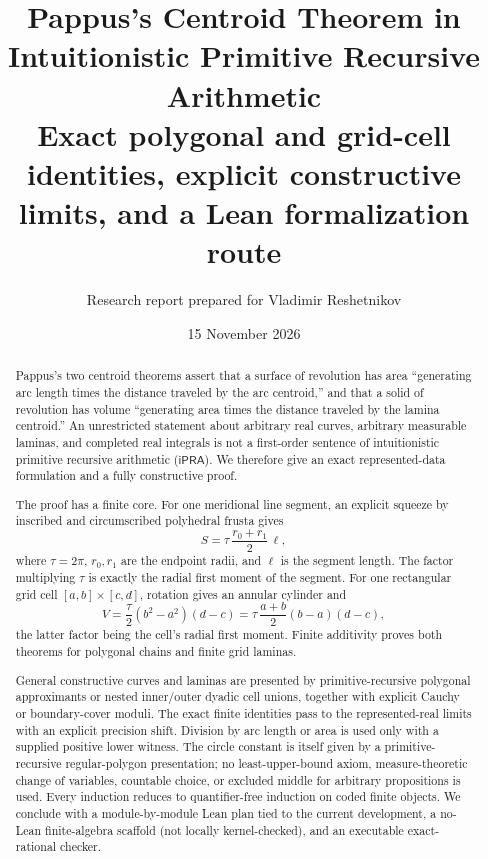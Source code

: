 \documentclass[11pt]{article}
\title{\textbf{Pappus's Centroid Theorem in Intuitionistic Primitive Recursive Arithmetic}\\
       \large Exact polygonal and grid-cell identities, explicit constructive limits, and a Lean formalization route}
\author{Research report prepared for Vladimir Reshetnikov}
\date{15 November 2026}
\theoremstyle{definition}
\newcommand{\ipra}{\mathsf{iPRA}}
\newcommand{\code}[1]{\texttt{\detokenize{#1}}}
\begin{document}
\maketitle

\begin{abstract}
Pappus's two centroid theorems assert that a surface of revolution has area
``generating arc length times the distance traveled by the arc centroid,'' and
that a solid of revolution has volume ``generating area times the distance
traveled by the lamina centroid.''  An unrestricted statement about arbitrary
real curves, arbitrary measurable laminas, and completed real integrals is not
a first-order sentence of intuitionistic primitive recursive arithmetic
(\(\ipra\)).  We therefore give an exact represented-data formulation and a
fully constructive proof.

The proof has a finite core.  For one meridional line segment, an explicit squeeze by inscribed and
circumscribed polyhedral frusta gives
\[
  S=\tau\,\frac{r_0+r_1}{2}\,\ell,
\]
where \(\tau=2\pi\), \(r_0,r_1\) are the endpoint radii, and \(\ell\) is the
segment length.  The factor multiplying \(\tau\) is exactly the radial first
moment of the segment.  For one rectangular grid cell
\([a,b]\times[c,d]\), rotation gives an annular cylinder and
\[
  V=\frac{\tau}{2}(b^2-a^2)(d-c)
   =\tau\,\frac{a+b}{2}(b-a)(d-c),
\]
the latter factor being the cell's radial first moment.  Finite additivity
proves both theorems for polygonal chains and finite grid laminas.

General constructive curves and laminas are presented by primitive-recursive
polygonal approximants or nested inner/outer dyadic cell unions, together with
explicit Cauchy or boundary-cover moduli.  The exact finite identities pass to
the represented-real limits with an explicit precision shift.  Division by
arc length or area is used only with a supplied positive lower witness.  The
circle constant is itself given by a primitive-recursive regular-polygon
presentation; no least-upper-bound axiom, measure-theoretic change of
variables, countable choice, or excluded middle for arbitrary propositions is
used.  Every induction reduces to quantifier-free induction on coded finite
objects.  We conclude with a module-by-module Lean plan tied to the current
\code{ConciseIPRA} development, a no-\code{sorry} Lean finite-algebra scaffold (not locally kernel-checked), and
an executable exact-rational checker.
\end{abstract}

\tableofcontents
\end{document}
